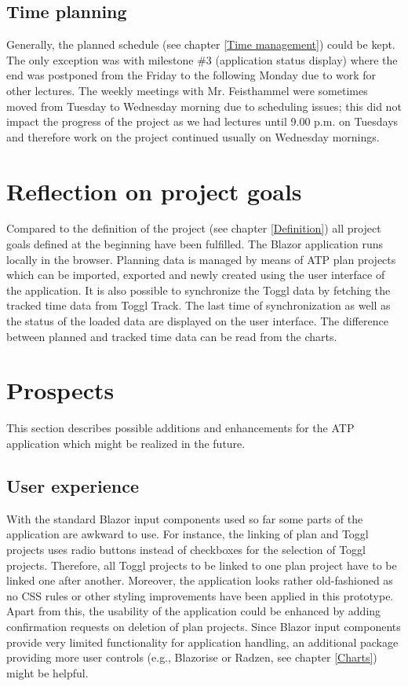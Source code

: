 \subsection{Time planning}
Generally, the planned schedule (see chapter \ref{Time management}) could be kept. The only exception was with milestone \#3 (application status display) where the end was postponed from the Friday to the following Monday due to work for other lectures. The weekly meetings with Mr. Feisthammel were sometimes moved from Tuesday to Wednesday morning due to scheduling issues; this did not impact the progress of the project as we had lectures until 9.00 p.m. on Tuesdays and therefore work on the project continued usually on Wednesday mornings.

\section{Reflection on project goals}
Compared to the definition of the project (see chapter \ref{Definition}) all project goals defined at the beginning have been fulfilled. The Blazor application runs locally in the browser. Planning data is managed by means of ATP plan projects which can be imported, exported and newly created using the user interface of the application. It is also possible to synchronize the Toggl data by fetching the tracked time data from Toggl Track. The last time of synchronization as well as the status of the loaded data are displayed on the user interface. The difference between planned and tracked time data can be read from the charts.

\section{Prospects} \label{Prospects}
This section describes possible additions and enhancements for the ATP application which might be realized in the future.

\subsection{User experience}
With the standard Blazor input components used so far some parts of the application are awkward to use. For instance, the linking of plan and Toggl projects uses radio buttons instead of checkboxes for the selection of Toggl projects. Therefore, all Toggl projects to be linked to one plan project have to be linked one after another. Moreover, the application looks rather old-fashioned as no CSS rules or other styling improvements have been applied in this prototype. Apart from this, the usability of the application could be enhanced by adding confirmation requests on deletion of plan projects. Since Blazor input components provide very limited functionality for application handling, an additional package providing more user controls (e.g., Blazorise or Radzen, see chapter \ref{Charts}) might be helpful.

